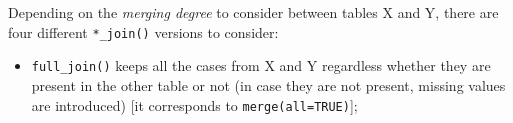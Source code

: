 \documentclass[
]{krantz}
\providecommand{\tightlist}{%
  \setlength{\itemsep}{0pt}\setlength{\parskip}{0pt}}
\begin{document}
Depending on the \emph{merging degree} to consider between tables X and Y, there are four different \texttt{*\_join()} versions to consider:

\begin{itemize}
\tightlist
\item
  \texttt{full\_join()} keeps all the cases from X and Y regardless whether they are present in the other table or not (in case they are not present, missing values are introduced) {[}it corresponds to \texttt{merge(all=TRUE)}{]};
\end{itemize}

\providecommand{\docline}[3]{\noalign{\global\setlength{\arrayrulewidth}{#1}}\arrayrulecolor[HTML]{#2}\cline{#3}}

\setlength{\tabcolsep}{0pt}

\renewcommand*{\arraystretch}{1.5}
\end{document}
